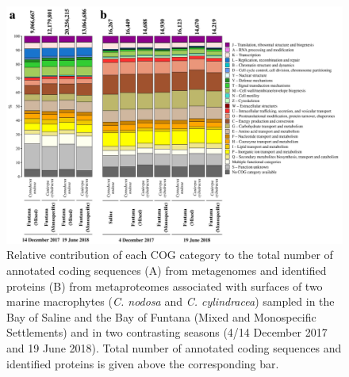 \documentclass[12pt,]{article}
\begin{document}
\newpage
\begin{figure}[ht]

{\centering \includegraphics[width=1\linewidth]{../results/figures/cog} 

}

\caption{Relative contribution of each COG category to the total number of annotated coding sequences (A) from metagenomes and identified proteins (B) from metaproteomes associated with surfaces of two marine macrophytes (\textit{C. nodosa} and \textit{C. cylindracea}) sampled in the Bay of Saline and the Bay of Funtana (Mixed and Monospecific Settlements) and in two contrasting seasons (4/14 December 2017 and 19 June 2018). Total number of annotated coding sequences and identified proteins is given above the corresponding bar.\label{cog}}\label{fig:unnamed-chunk-5}
\end{figure}
\end{document}
